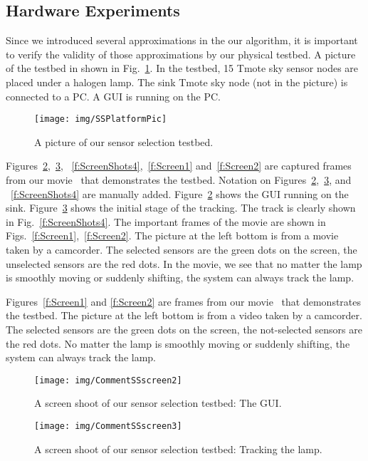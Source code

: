 \subsection{Hardware Experiments}\label{s:hardware}
Since we introduced several approximations in the our algorithm, it is important to verify the validity of those approximations by our physical testbed. A picture of the testbed in shown in Fig.~\ref{f:SSPlatformPic}. In the testbed, 15 Tmote sky sensor nodes are placed under a halogen lamp. The sink Tmote sky node (not in the picture) is connected to a PC. A GUI is running on the PC.


\begin{figure}
  \centering
  \texttt{[image: img/SSPlatformPic]}
  \caption{A picture of our sensor selection testbed.}\label{f:SSPlatformPic}
\end{figure}

 Figures~\ref{f:ScreenShots2},~\ref{f:ScreenShots3}, ~\ref{f:ScreenShots4},~\ref{f:Screen1} and~\ref{f:Screen2} are captured frames from our movie~\cite{zhencossUrl}
 that demonstrates the testbed. Notation on Figures~\ref{f:ScreenShots2},~\ref{f:ScreenShots3}, and ~\ref{f:ScreenShots4} are manually added.
 Figure~\ref{f:ScreenShots2} shows the GUI running on the sink. Figure~\ref{f:ScreenShots3} shows the initial stage of the tracking. The track is clearly shown in Fig.~\ref{f:ScreenShots4}.
    The important frames of the movie are shown in Figs.~\ref{f:Screen1},~\ref{f:Screen2}.
        The picture at the left bottom is from a movie taken by a camcorder. The selected sensors are the green dots on the screen, the unselected sensors are the red dots. In the movie, we see that no matter the lamp is smoothly moving or suddenly shifting, the system can always track the lamp.

 Figures~\ref{f:Screen1} and \ref{f:Screen2} are frames from our movie~\cite{zhencossUrl} that demonstrates the testbed. The picture at the left bottom is from a video taken by a camcorder. The selected sensors are the green dots on the screen, the not-selected sensors are the red dots. No matter the lamp is smoothly moving or suddenly shifting, the system can always track the lamp.


\begin{figure}
  \centering
  \texttt{[image: img/CommentSSscreen2]}
  \caption{A screen shoot of our sensor selection testbed: The GUI.}\label{f:ScreenShots2}
\end{figure}

\begin{figure}
  \centering
  \texttt{[image: img/CommentSSscreen3]}
  \caption{A screen shoot of our sensor selection testbed: Tracking the lamp.}\label{f:ScreenShots3}
\end{figure}


